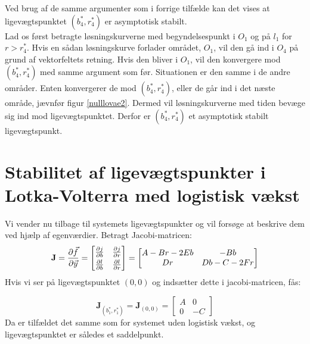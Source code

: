 Ved brug af de samme argumenter som i forrige tilfælde kan det vises at ligevægtspunktet $(b_4^*,r_4^*)$ er asymptotisk stabilt. \\ 
\hfill \break
Lad os først betragte løsningskurverne med begyndelsespunkt i $O_1$ og på $l_1$ for $r>r_4^*$. Hvis en sådan løsningskurve forlader området, $O_1$, vil den gå ind i $O_4$ på grund af vektorfeltets retning. Hvis den bliver i $O_1$, vil den konvergere mod $(b_4^*,r_4^*)$ med samme argument som før. Situationen er den samme i de andre områder. Enten konvergerer de mod $(b_4^*,r_4^*)$, eller de går ind i det næste område, jævnfør figur \ref{nulllovae2}. Dermed vil løsningskurverne med tiden bevæge sig ind mod ligevægtspunktet. Derfor er $(b_4^*,r_4^*)$ et asymptotisk stabilt ligevægtspunkt. 
\hfill \break

\section{Stabilitet af ligevægtspunkter i Lotka-Volterra med logistisk vækst}
Vi vender nu tilbage til systemets ligevægtspunkter og vil forsøge at beskrive dem ved hjælp af egenværdier.
Betragt Jacobi-matricen:
        \begin{equation}\label{jacobilovae}
        \textbf{J} =
        \frac{\partial\vec{f}}{\partial \vec{y}}=
         \begin{bmatrix}
        \frac{\partial j}{\partial b} & \frac{\partial j}{\partial r}\vspace{1mm}\\
        \frac{\partial l}{\partial b} & \frac{\partial l}{\partial r}
        \end{bmatrix}
        =
        \begin{bmatrix}
        A-Br-2Eb & -Bb\\
        Dr & Db-C-2Fr
        \end{bmatrix}
        \end{equation}
Hvis vi ser på ligevægtspunktet $(0,0)$ og indsætter dette i jacobi-matricen, fås:

        \[
        \textbf{J}_{\left(b^*_1,r^*_1 \right)} =
        \textbf{J}_{\left(0,0 \right)} =
        \begin{bmatrix}
        A & 0\\
        0 & -C
        \end{bmatrix}
        \]
Da er tilfældet det samme som for systemet uden logistisk vækst, og ligevægtspunktet er således et saddelpunkt. 
\hfill \break

